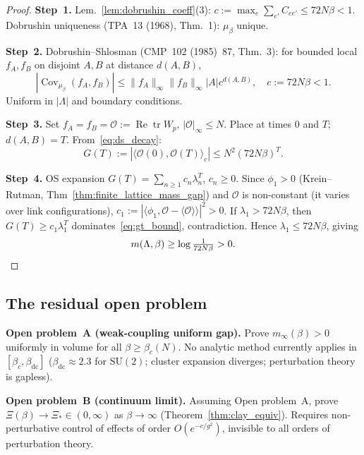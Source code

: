 \begin{proof}
\textbf{Step~1.}
Lem.~\ref{lem:dobrushin_coeff}(3): $c:=\max_e\sum_{e'}C_{ee'}\le72N\beta<1$.
Dobrushin uniqueness (TPA~13 (1968), Thm.~1): $\mu_\beta$ unique.

\textbf{Step~2.}
Dobrushin--Shlosman (CMP~102 (1985)~87, Thm.~3):
for bounded local $f_A,f_B$ on disjoint $A,B$ at distance $d(A,B)$,
\begin{equation}
\label{eq:ds_decay}
|\operatorname{Cov}_{\mu_\beta}(f_A,f_B)|\le\|f_A\|_{\infty}\|f_B\|_{\infty}|A|c^{d(A,B)},
\quad c:=72N\beta<1.
\end{equation}
Uniform in $|\Lambda|$ and boundary conditions.

\textbf{Step~3.}
Set $f_A=f_B=\mathcal{O}:=\operatorname{Re}\operatorname{tr}W_p$, $|\mathcal{O}|_{\infty}\le N$.
Place at times $0$ and $T$; $d(A,B)=T$. From~\eqref{eq:ds_decay}:
\begin{equation}
\label{eq:gt_bound}
G(T):=|\langle\mathcal{O}(0),\mathcal{O}(T)\rangle_c|\le N^2(72N\beta)^T.
\end{equation}

\textbf{Step~4.}
OS expansion $G(T)=\sum_{n\ge1}c_n\lambda_n^T$, $c_n\ge0$.
Since $\phi_1>0$ (Krein--Rutman, Thm~\ref{thm:finite_lattice_mass_gap})
and $\mathcal{O}$ is non-constant (it varies over link configurations),
$c_1:=|\langle\phi_1,\mathcal{O}-\langle\mathcal{O}\rangle\rangle|^2>0$.
If $\lambda_1>72N\beta$,
then $G(T)\ge c_1\lambda_1^T$ dominates~\eqref{eq:gt_bound}, contradiction.
Hence $\lambda_1\le 72N\beta$, giving
\[m(\Lambda,\beta)\ge\log\tfrac{1}{72N\beta}>0.\qedhere\]
\end{proof}

\subsection{The residual open problem}
\label{ssec:residual_open}

\noindent\textbf{Open problem~A (weak-coupling uniform gap).}
Prove $m_{\infty}(\beta)>0$ uniformly in volume for all $\beta\ge\beta_c(N)$.
No analytic method currently applies in $[\beta_c,\beta_{\mathrm{dc}}]$ ($\beta_{\mathrm{dc}}\approx2.3$ for $\mathrm{SU}(2)$;
cluster expansion diverges; perturbation theory is gapless).

\medskip\noindent\textbf{Open problem~B (continuum limit).}
Assuming Open problem~A, prove $\Xi(\beta)\to\Xi_*\in(0,\infty)$ as $\beta\to\infty$
(Theorem~\ref{thm:clay_equiv}).
Requires non-perturbative control of effects of order $O(e^{-c/g^2})$,
invisible to all orders of perturbation theory.

